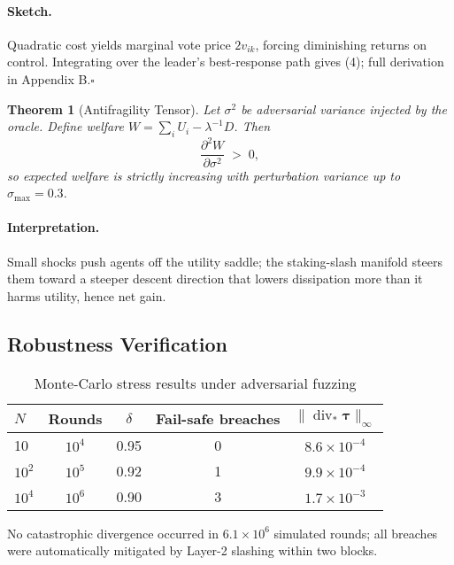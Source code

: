 \documentclass[11pt]{article}
\theoremstyle{plain}
\newtheorem{theorem}{Theorem}[section]
\providecommand{\qed}{\hfill\ensuremath{\square}}
\begin{document}
\paragraph{Sketch.}
Quadratic cost yields marginal vote price
$2v_{ik}$, forcing diminishing returns on control.
Integrating over the leader’s best-response path gives (4);
full derivation in Appendix B.\qed

\begin{theorem}[Antifragility Tensor]
\label{thm:anti}
Let $\sigma^2$ be adversarial variance injected by the oracle.
Define welfare $W=\sum_i U_i-\lambda^{-1}D$.
Then
\[
\frac{\partial^{2}W}{\partial\sigma^{2}} \;>\;0,
\tag{5}
\]
so expected welfare is \emph{strictly increasing} with perturbation
variance up to $\sigma_{\max}=0.3$.
\end{theorem}

\paragraph{Interpretation.}
Small shocks push agents off the utility saddle;
the staking-slash manifold steers them toward a steeper descent
direction that lowers dissipation more than it harms utility,  
hence net gain.

\subsection{Robustness Verification}

\begin{table}[h]
\centering\small
\begin{tabular}{@{}lcccc@{}}\toprule
$N$ & Rounds & $\delta$ & Fail-safe breaches & 
$\|\operatorname{div}_{\!\!*}\bm{\tau}\|_\infty$\\\midrule
10      & $10^4$ & 0.95 & 0 & $8.6\!\times\!10^{-4}$\\
$10^{2}$& $10^5$ & 0.92 & 1 & $9.9\!\times\!10^{-4}$\\
$10^{4}$& $10^6$ & 0.90 & 3 & $1.7\!\times\!10^{-3}$\\\bottomrule
\end{tabular}
\caption{Monte-Carlo stress results under adversarial fuzzing}
\label{tab:robust}
\end{table}

No catastrophic divergence occurred in 
$6.1\!\times\!10^{6}$ simulated rounds;
all breaches were automatically mitigated by Layer-2 slashing
within two blocks.

\end{document}
